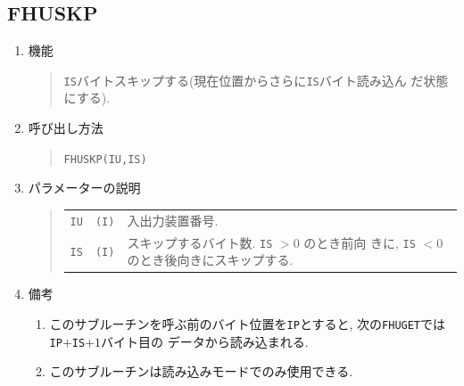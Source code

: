 \subsection{FHUSKP}
\begin{enumerate}
  \item 機能 
  \begin{quote}
   {\tt IS}バイトスキップする(現在位置からさらに{\tt IS}バイト読み込ん
   だ状態にする).
  \end{quote}
  \item 呼び出し方法 
  \begin{quote}
   {\tt FHUSKP(IU,IS)}
  \end{quote}
  \item パラメーターの説明 
  \begin{quote}
    \begin{tabular}{llp{10cm}}
      {\tt IU}   & {\tt (I)} & 入出力装置番号. \\
      {\tt IS}   & {\tt (I)} & スキップするバイト数. {\tt IS} $>0$ のとき前向
                               きに, {\tt IS} $<0$ のとき後向きにスキップする.
    \end{tabular}
  \end{quote}
  \item 備考 
  \begin{enumerate}
    \item このサブルーチンを呼ぶ前のバイト位置を{\tt IP}とすると, 
          次の{\tt FHUGET}では{\tt IP}$+${\tt IS}$+1$バイト目の
          データから読み込まれる.
    \item このサブルーチンは読み込みモードでのみ使用できる. 
  \end{enumerate}
\end{enumerate}

